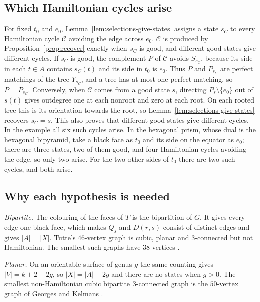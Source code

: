 \documentclass[10pt]{amsart}
\numberwithin{equation}{section}
\theoremstyle{definition}
\theoremstyle{remark}
\newcommand{\T}{T}
\begin{document}
\subsection*{Which Hamiltonian cycles arise}
For fixed $t_0$ and $e_0$, Lemma~\ref{lem:selections-give-states} assigns a state $s_C$ to every Hamiltonian cycle $\mathcal{C}$ avoiding the edge across $e_0$.
$\mathcal{C}$ is produced by Proposition~\ref{prop:recover} exactly when $s_C$ is good, and different good states give different cycles.
If $s_C$ is good, the complement $P$ of $\mathcal{C}$ avoids $S_{s_C}$, because its side in each $t\in A$ contains $s_C(t)$ and its side in $t_0$ is $e_0$.
Thus $P$ and $P_{s_C}$ are perfect matchings of the tree $Y_{s_C}$, and a tree has at most one perfect matching, so $P=P_{s_C}$.
Conversely, when $\mathcal{C}$ comes from a good state $s$, directing $P_s\setminus\{e_0\}$ out of $s(t)$ gives outdegree one at each nonroot and zero at each root.
On each rooted tree this is its orientation towards the root, so Lemma~\ref{lem:selections-give-states} recovers $s_C=s$.
This also proves that different good states give different cycles.
In the example all six such cycles arise.
In the hexagonal prism, whose dual is the hexagonal bipyramid, take a black face as $t_0$ and its side on the equator as $e_0$; there are three states, two of them good, and four Hamiltonian cycles avoiding the edge, so only two arise.
For the two other sides of $t_0$ there are two such cycles, and both arise.

\subsection*{Why each hypothesis is needed}
\emph{Bipartite.} The colouring of the faces of $\T$ is the bipartition of $G$. It gives every edge one black face, which makes $Q_s$ and $D(r,s)$ consist of distinct edges and gives $|A|=|X|$.
Tutte's $46$-vertex graph \cite{Tutte1946} is cubic, planar and $3$-connected but not Hamiltonian. The smallest such graphs have $38$ vertices \cite{holton-mckay1988}.

\emph{Planar.} On an orientable surface of genus $g$ the same counting gives $|V|=k+2-2g$, so $|X|=|A|-2g$ and there are no states when $g>0$. The smallest non-Hamiltonian cubic bipartite $3$-connected graph is the $50$-vertex graph of Georges and Kelmans \cite{georges1989,Brinkmann2022}.
\end{document}
